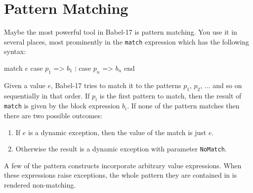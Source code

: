 \documentclass[11pt]{amsart}
\newcommand{\babelsrc}[1] {\lstinline!#1!}
\begin{document}
\section{Pattern Matching}
Maybe the most powerful tool in Babel-17 is pattern matching. You use it in several places, most prominently in the \babelsrc{match} expression which has the following syntax:
\begin{babellisting}
match $e$ 
  case $p_1$ => $b_1$
  $\vdots$
  case $p_n$ => $b_n$
end  
\end{babellisting}
Given a value $e$, Babel-17 tries to match it to the patterns $p_1$, $p_2$, $\ldots$ and so on sequentially in that order. If $p_i$ is the first pattern to match, then the result of \babelsrc{match} 
is given by the block expression $b_i$. If none of the pattern matches then there are two possible outcomes:
\begin{enumerate}
\item If $e$ is a dynamic exception, then the value of the match is just $e$.
\item Otherwise the result is a dynamic exception with parameter \babelsrc{NoMatch}.
\end{enumerate}
A few of the pattern constructs  incorporate arbitrary value expressions. When these expressions raise exceptions, the whole pattern they are contained in is rendered non-matching.
\end{document}
